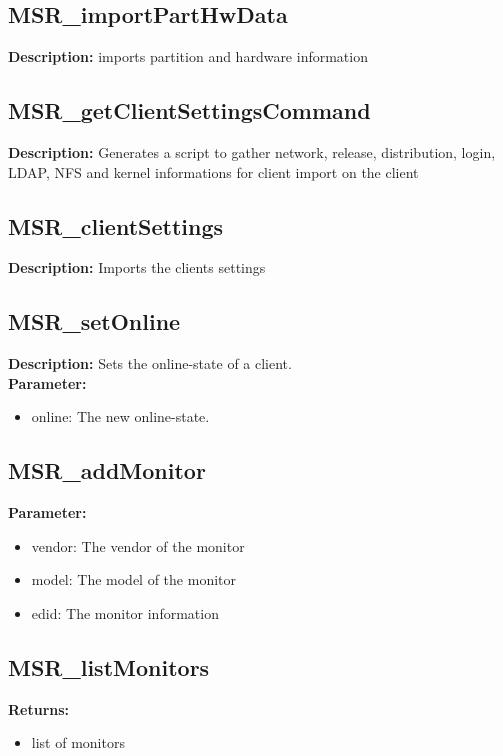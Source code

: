 \subsection{MSR\_importPartHwData}
\textbf{Description:} imports partition and hardware information\\

\subsection{MSR\_getClientSettingsCommand}
\textbf{Description:} Generates a script to gather network, release, distribution, login, LDAP, NFS and kernel informations for client import on the client\\

\subsection{MSR\_clientSettings}
\textbf{Description:} Imports the clients settings\\

\subsection{MSR\_setOnline}
\textbf{Description:} Sets the online-state of a client.\\
\textbf{Parameter:}
\begin{itemize}
\item online: The new online-state.
\end{itemize}

\subsection{MSR\_addMonitor}
\textbf{Parameter:}
\begin{itemize}
\item vendor: The vendor of the monitor
\item model: The model of the monitor
\item edid: The monitor information
\end{itemize}

\subsection{MSR\_listMonitors}
\textbf{Returns:}
\begin{itemize}
\item list of monitors
\end{itemize}


